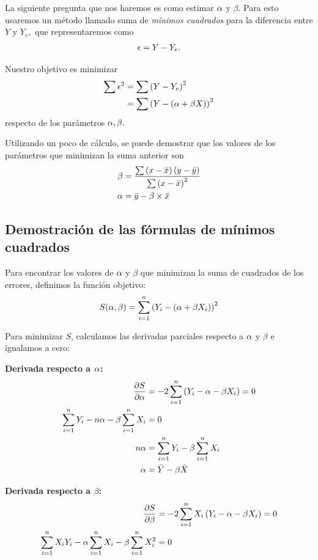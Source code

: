 La siguiente pregunta que nos haremos es como estimar $\alpha$ y $\beta.$  Para esto usaremos un método llamado suma de  \emph{mínimos cuadrados} para la diferencia entre $Y$ y $Y_{e},$ que representaremos como
\begin{align}
	\epsilon = Y-Y_{e}.
\end{align}



Nuestro objetivo es minimizar
\begin{align}
	\sum \epsilon^{2} & = \sum \left( Y-Y_{e} \right)^{2}\\
	&= \sum \left( Y - \left( \alpha+\beta X \right) \right)^{2}
\end{align}
respecto de los parámetros $\alpha, \beta.$


Utilizando un poco de cálculo, se puede demostrar que los valores de los parámetros que minimizan la suma anterior son
\begin{align}
	\label{beta}
	\beta &= \dfrac{\sum \left( x-\bar{x} \right)\left( y-\bar{y} \right)}{\sum\left( x-\bar{x} \right)^{2}}\\
	\label{alfa}
	\alpha &= \bar{y}-\beta\times \bar{x}
\end{align}

\subsection{Demostración de las fórmulas de mínimos cuadrados}

Para encontrar los valores de $\alpha$ y $\beta$ que minimizan la suma de cuadrados de los errores, definimos la función objetivo:
\begin{align}
	S(\alpha, \beta) = \sum_{i=1}^{n} \left( Y_i - (\alpha + \beta X_i) \right)^2
\end{align}

Para minimizar $S$, calculamos las derivadas parciales respecto a $\alpha$ y $\beta$ e igualamos a cero:

\textbf{Derivada respecto a $\alpha$:}
\begin{align}
	\frac{\partial S}{\partial \alpha} &= -2 \sum_{i=1}^{n} \left( Y_i - \alpha - \beta X_i \right) = 0 \\
	\sum_{i=1}^{n} Y_i - n\alpha - \beta \sum_{i=1}^{n} X_i &= 0 \\
	n\alpha &= \sum_{i=1}^{n} Y_i - \beta \sum_{i=1}^{n} X_i \\
	\alpha &= \bar{Y} - \beta \bar{X}
\end{align}

\textbf{Derivada respecto a $\beta$:}
\begin{align}
	\frac{\partial S}{\partial \beta} &= -2 \sum_{i=1}^{n} X_i \left( Y_i - \alpha - \beta X_i \right) = 0 \\
	\sum_{i=1}^{n} X_i Y_i - \alpha \sum_{i=1}^{n} X_i - \beta \sum_{i=1}^{n} X_i^2 &= 0
\end{align}

